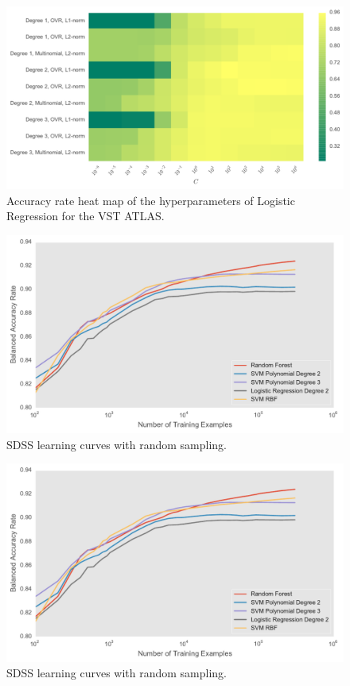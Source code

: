 \begin{figure}[tbp]
	\centering
	\includegraphics[width=\textwidth]{figures/heat_vstatlas_vgridsearch_logistic}
	\caption{Accuracy rate heat map of the hyperparameters of Logistic Regression for the VST ATLAS.}
	\label{fig:vst_heat_logistic}
\end{figure}


\begin{figure}[tbp]
	\centering
	\includegraphics[width=\textwidth]{figures/4_expt1/sdss_learning_curves}
	\caption{SDSS learning curves with random sampling.}
	\label{fig:sdss_learning}
\end{figure}

\begin{figure}[tbp]
	\centering
	\includegraphics[width=\textwidth]{figures/4_expt1/sdss_learning_curves}
	\caption{SDSS learning curves with random sampling.}
	\label{fig:sdss_learning}
\end{figure}



